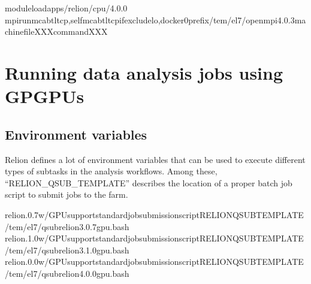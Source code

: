 \documentclass[a4paper,11pt,english]{sphinxmanual}
\begin{document}
\begin{sphinxVerbatim}[commandchars=\\\{\}]
moduleloadapps/relion/cpu/4.0.0
mpirun\PYGZhy{}\PYGZhy{}mcabtltcp,self\PYGZhy{}\PYGZhy{}mcabtl\PYGZus{}tcp\PYGZus{}if\PYGZus{}excludelo,docker0\PYGZhy{}\PYGZhy{}prefix/tem/el7/openmpi\PYGZhy{}4.0.3\PYGZhy{}machinefileXXXcommandXXX

\end{sphinxVerbatim}


\section{Running data analysis jobs using GPGPUs}
\label{\detokenize{relion:running-data-analysis-jobs-using-gpgpus}}

\subsection{Environment variables}
\label{\detokenize{relion:id1}}
\sphinxAtStartPar
Relion defines a lot of environment variables that can be used to execute different types of subtasks in the analysis workflows. Among these, “RELION\_QSUB\_TEMPLATE” describes the location of a proper batch job script to submit jobs to the farm.

\begin{sphinxVerbatim}[commandchars=\\\{\}]
relion.0.7w/GPUsupportstandardjobsubmissionscriptRELION\PYGZus{}QSUB\PYGZus{}TEMPLATE/tem/el7/qsub\PYGZhy{}relion\PYGZhy{}3.0.7\PYGZhy{}gpu.bash
relion.1.0w/GPUsupportstandardjobsubmissionscriptRELION\PYGZus{}QSUB\PYGZus{}TEMPLATE/tem/el7/qsub\PYGZhy{}relion\PYGZhy{}3.1.0\PYGZhy{}gpu.bash
relion.0.0w/GPUsupportstandardjobsubmissionscriptRELION\PYGZus{}QSUB\PYGZus{}TEMPLATE/tem/el7/qsub\PYGZhy{}relion\PYGZhy{}4.0.0\PYGZhy{}gpu.bash
\end{sphinxVerbatim}
\end{document}
